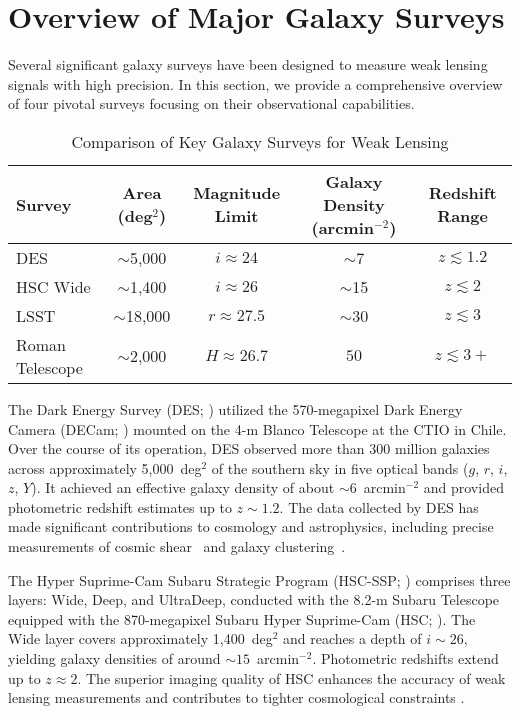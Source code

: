 \section{Overview of Major Galaxy Surveys}
Several significant galaxy surveys have been designed to measure weak lensing signals with high precision. In this section, we provide a comprehensive overview of four pivotal surveys focusing on their observational capabilities.
\begin{table}[h]
    \centering
    \caption{Comparison of Key Galaxy Surveys for Weak Lensing}
    \label{tab:survey_comparison}
    \begin{tabular}{lcccc}
        \toprule
        \textbf{Survey} & \textbf{Area (deg$^2$)} & \textbf{Magnitude Limit} & \textbf{Galaxy Density (arcmin$^{-2}$)} & \textbf{Redshift Range} \\
        \midrule
        DES & $\sim$5,000 & $i \approx 24$ & $\sim$7 & $z \lesssim 1.2$ \\
        HSC Wide & $\sim$1,400 & $i \approx 26$ & $\sim$15 & $z \lesssim 2$ \\
        LSST & $\sim$18,000 & $r \approx 27.5$ & $\sim$30 & $z \lesssim 3$ \\
        Roman Telescope & $\sim$2,000 & $H \approx 26.7$ & $50$ & $z \lesssim 3+$ \\
        \bottomrule
    \end{tabular}
\end{table}
The Dark Energy Survey (DES; \citealt{2005astro.ph.10346T, 2018ApJS..239...18A, 2021ApJS..255...20A}) utilized the 570-megapixel Dark Energy Camera (DECam; \citealt{2015AJ....150..150F}) mounted on the 4-m Blanco Telescope at the CTIO in Chile. Over the course of its operation, DES observed more than 300 million galaxies across approximately 5,000~deg$^2$ of the southern sky in five optical bands ($g$, $r$, $i$, $z$, $Y$). It achieved an effective galaxy density of about $\sim 6$~arcmin$^{-2}$ and provided photometric redshift estimates up to $z \sim 1.2$. The data collected by DES has made significant contributions to cosmology and astrophysics, including precise measurements of cosmic shear~\citep{2022PhRvD.105b3514A} and galaxy clustering~\citep{2022PhRvD.105b3520A}. 

The Hyper Suprime-Cam Subaru Strategic Program (HSC-SSP; \citealt{2018PASJ...70S...4A}) comprises three layers: Wide, Deep, and UltraDeep, conducted with the 8.2-m Subaru Telescope equipped with the 870-megapixel Subaru Hyper Suprime-Cam (HSC; \citealt{2018PASJ...70S...1M}). The Wide layer covers approximately 1,400~deg$^2$ and reaches a depth of $i \sim 26$, yielding galaxy densities of around $\sim 15$~arcmin$^{-2}$. Photometric redshifts extend up to $z \approx 2$. The superior imaging quality of HSC enhances the accuracy of weak lensing measurements and contributes to tighter cosmological constraints \citep{2019PASJ...71...43H}.

